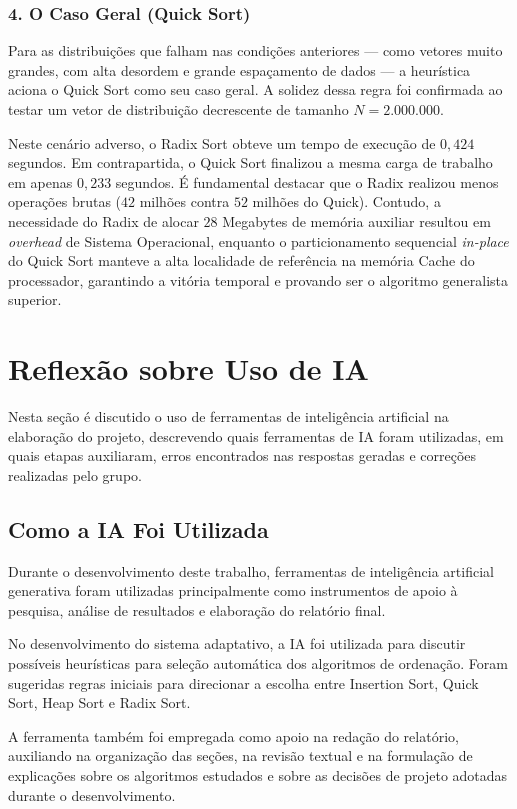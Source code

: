 \documentclass{article}
\begin{document}
    \subsubsection*{4. O Caso Geral (Quick Sort)}
    Para as distribuições que falham nas condições anteriores — como vetores muito grandes, com alta desordem e grande espaçamento de dados — a heurística aciona o Quick Sort como seu caso geral. A solidez dessa regra foi confirmada ao testar um vetor de distribuição decrescente de tamanho $N = 2.000.000$.

    Neste cenário adverso, o Radix Sort obteve um tempo de execução de $0,424$ segundos. Em contrapartida, o Quick Sort finalizou a mesma carga de trabalho em apenas $0,233$ segundos. É fundamental destacar que o Radix realizou menos operações brutas ($42$ milhões contra $52$ milhões do Quick). Contudo, a necessidade do Radix de alocar $28$ Megabytes de memória auxiliar resultou em \textit{overhead} de Sistema Operacional, enquanto o particionamento sequencial \textit{in-place} do Quick Sort manteve a alta localidade de referência na memória Cache do processador, garantindo a vitória temporal e provando ser o algoritmo generalista superior.


\section{Reflexão sobre Uso de IA}
Nesta seção é discutido o uso de ferramentas de inteligência artificial na elaboração do projeto, descrevendo quais ferramentas de IA foram utilizadas, em quais etapas auxiliaram, erros encontrados nas respostas geradas e correções realizadas pelo grupo.

\subsection{Como a IA Foi Utilizada}
Durante o desenvolvimento deste trabalho, ferramentas de inteligência artificial generativa foram utilizadas principalmente como instrumentos de apoio à pesquisa, análise de resultados e elaboração do relatório final.

No desenvolvimento do sistema adaptativo, a IA foi  utilizada para discutir possíveis heurísticas para seleção automática dos algoritmos de ordenação. Foram sugeridas regras iniciais para direcionar a escolha entre Insertion Sort, Quick Sort, Heap Sort e Radix Sort.

A ferramenta também foi empregada como apoio na redação do relatório, auxiliando na organização das seções, na revisão textual e na formulação de explicações sobre os algoritmos estudados e sobre as decisões de projeto adotadas durante o desenvolvimento.
\end{document}
